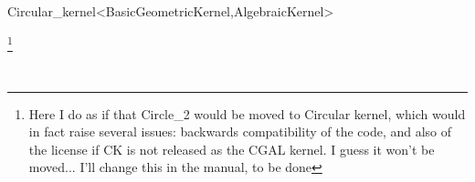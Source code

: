 \begin{ccRefClass}{Circular_kernel<BasicGeometricKernel,AlgebraicKernel>}
\ccGlue
{} 
\ccGlue
{}
\ccGlue
{}

\footnote{Here I do as if that Circle\_2 would be moved to Circular
kernel, which would in fact raise several issues:
backwards compatibility of the code, and also of the license if CK is
not released as the CGAL kernel. I guess it won't be moved... I'll change this in the 
manual, to be done}

\ccSeeAlso

\\

\end{ccRefClass}
